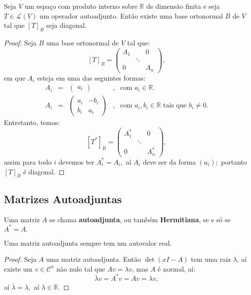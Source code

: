 \documentclass[11pt,twoside,a4paper]{book}
\begin{document}
\begin{teorema}\label{hermitiano}
Seja $V$ um espaço com produto interno sobre $\mathbb{R}$ de dimensão finita e seja $T\in\mathcal{L}(V)$ um operador autoadjunto. Então existe uma base ortonormal $B$ de $V$ tal que $[T]_B$ seja diagonal.
\end{teorema}
\begin{proof}
Seja $B$ uma base ortonormal de $V$ tal que:
\[
[T]_B=\begin{pmatrix}
A_1&&0\\&\ddots&\\0&&A_n
\end{pmatrix},
\]
em que $A_i$ esteja em uma das seguintes formas:
\[
\begin{array}{ccccl}
A_i&=&\begin{pmatrix}
a_i
\end{pmatrix}&,&\text{com }a_i\in\mathbb{R}.\\
A_i&=&\begin{pmatrix}
a_i&-b_i\\b_i&a_i
\end{pmatrix}&,&\text{com }a_i,b_i\in\mathbb{R}\text{ tais que }b_i\neq 0.
\end{array}
\]
Entretanto, temos:
\[
[T^*]_B=\begin{pmatrix}
A_1^*&&0\\&\ddots&\\0&&A_n^*
\end{pmatrix},
\]
assim para todo $i$ devemos ter $A^*_i=A_i,$ aí $A_i$ deve ser da forma $(a_i);$ portanto $[T]_B$ é diagonal.
\end{proof}

\subsection{Matrizes Autoadjuntas}

\begin{definicao}
Uma matriz $A$ se chama \textbf{autoadjunta}, ou também \textbf{Hermitiana}, se e só se $A^*=A.$
\end{definicao}

\begin{proposicao}
Uma matriz autoadjunta sempre tem um autovalor real.
\end{proposicao}
\begin{proof}
Seja $A$ uma matriz autoadjunta. Então $\det(xI-A)$ tem uma raiz $\lambda$, aí existe um $v\in\mathcal{C}^n$ não nulo tal que $Av=\lambda v$, mas $A$ é normal, aí:
\[
\overline{\lambda}v=A^*v=Av=\lambda v,
\]
aí $\overline{\lambda}=\lambda,$ aí $\lambda\in\mathbb{R}.$
\end{proof}
\end{document}
